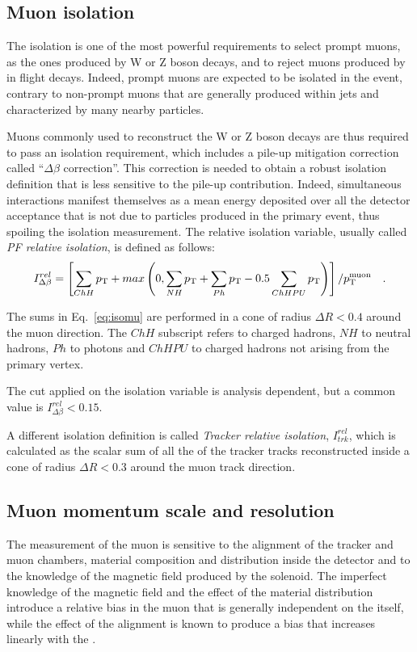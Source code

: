 \subsection{Muon isolation}
The isolation is one of the most powerful requirements to select prompt muons, as the ones produced by W or Z boson decays, and to reject muons produced by in flight decays. Indeed, prompt muons are expected to be isolated in the event, contrary to non-prompt muons that are generally produced within jets and characterized by many nearby particles.

Muons commonly used to reconstruct the W or Z boson decays are thus required to pass an isolation requirement, which includes a pile-up mitigation correction called ``$\Delta\beta$ correction''. This correction is needed to obtain a robust isolation definition that is less sensitive to the pile-up contribution. Indeed, simultaneous interactions manifest themselves as a mean energy deposited over all the detector acceptance that is not due to particles produced in the primary event, thus spoiling the isolation measurement. The relative isolation variable, usually called \emph{PF relative isolation}, is defined as follows:
\begin{equation}\label{eq:isomu}
I^{rel}_{\Delta\beta} = \left[  \sum_{ChH}p_\mathrm{T} + max\left(0, \sum_{NH}p_\mathrm{T} + \sum_{Ph}p_\mathrm{T} - 0.5\sum_{ChHPU}p_\mathrm{T}    \right)  \right]/p_\mathrm{T}^\mathrm{muon} \quad .
\end{equation}

The sums in Eq.~\eqref{eq:isomu} are performed in a cone of radius $\Delta R < 0.4$ around the muon direction. The $ChH$ subscript refers to charged hadrons, $NH$ to neutral hadrons, $Ph$ to photons and $ChHPU$ to charged hadrons not arising from the primary vertex.

The cut applied on the isolation variable is analysis dependent, but a common value is $I^{rel}_{\Delta\beta} < 0.15$.

A different isolation definition is called \emph{Tracker relative isolation}, $I^{rel}_{trk}$, which is calculated as the scalar sum of all the \pt of the tracker tracks reconstructed inside a cone of radius $\Delta R < 0.3$ around the muon track direction.

\subsection{Muon momentum scale and resolution}
The measurement of the muon \pt is sensitive to the alignment of the tracker and muon chambers, material composition and distribution inside the detector and to the knowledge of the magnetic field produced by the solenoid. The imperfect knowledge of the magnetic field and the effect of the material distribution introduce a relative bias in the muon \pt that is generally independent on the \pt itself, while the effect of the alignment is known to produce a bias that increases linearly with the \pt.

